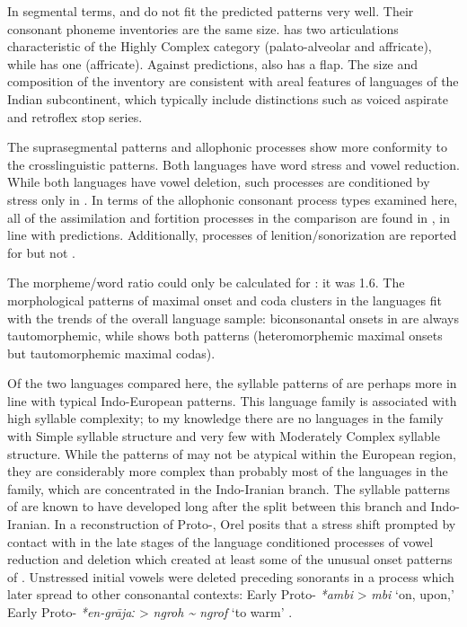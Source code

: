   In segmental terms,  and  do not fit the predicted patterns very well. Their consonant phoneme inventories are the same size.  has two articulations characteristic of the Highly Complex category (palato-alveolar and affricate), while  has one (affricate). Against predictions,  also has a flap. The size and composition of the  inventory are consistent with areal features of languages of the Indian subcontinent, which typically include distinctions such as voiced aspirate and retroflex stop series.

  The suprasegmental patterns and allophonic processes show more conformity to the crosslinguistic patterns. Both languages have word stress and vowel reduction. While both languages have vowel deletion, such processes are conditioned by stress only in . In terms of the allophonic consonant process types examined here, all of the assimilation and fortition processes in the comparison are found in , in line with predictions. Additionally, processes of lenition/sonorization are reported for  but not .

  The morpheme/word ratio could only be calculated for : it was 1.6. The morphological patterns of maximal onset and coda clusters in the languages fit with the trends of the overall language sample: biconsonantal onsets in  are always tautomorphemic, while  shows both patterns (heteromorphemic maximal onsets but tautomorphemic maximal codas).

  Of the two languages compared here, the syllable patterns of  are perhaps more in line with typical Indo-European patterns. This language family is associated with high syllable complexity; to my knowledge there are no languages in the family with Simple syllable structure and very few with Moderately Complex syllable structure. While the patterns of  may not be atypical within the European region, they are considerably more complex than probably most of the languages in the family, which are concentrated in the Indo-Iranian branch. The syllable patterns of  are known to have developed long after the split between this branch and Indo-Iranian. In a reconstruction of Proto-, Orel posits that a stress shift prompted by contact with  in the late stages of the language conditioned processes of vowel reduction and deletion which created at least some of the unusual onset patterns of . Unstressed initial vowels were deleted preceding sonorants in a process which later spread to other consonantal contexts: Early Proto- \textit{*ambi} >  \textit{mbi} ‘on, upon,’ Early Proto- \textit{*en-gr\={a}jaː} >  \textit{ngroh {\textasciitilde} ngrof} ‘to warm’ \citep[22]{Orel2000}.

